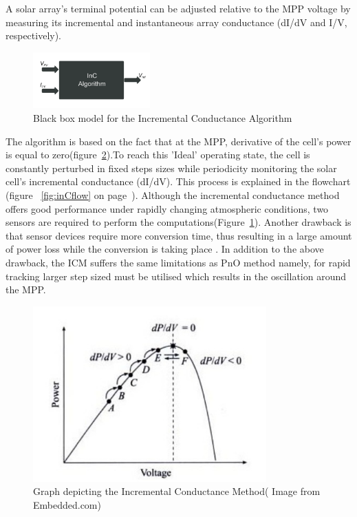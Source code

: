{  A solar array's terminal  potential  can  be  adjusted relative to the \ac{MPP} voltage by measuring its incremental and instantaneous  array  conductance (dI/dV and I/V, respectively).\\
   \begin{figure}[H]
             \begin{center}
             \includegraphics[width=0.4\textwidth]{images/inC_block}
             \caption{ Black box model for the Incremental Conductance Algorithm }
             \label{fig:inC_block}
        \end{center}
    \end{figure}
   The algorithm is based on the fact that at the \ac{MPP}, derivative of the cell's power is equal to zero(figure~\ref{fig:Inc_graph}).To reach this 'Ideal' operating state, the cell is constantly perturbed in fixed steps sizes while periodicity monitoring the solar cell's incremental conductance (dI/dV). This process is explained in the flowchart (figure ~\ref{fig:inCflow} on page~\pageref{fig:inCflow}).  Although the incremental conductance method offers good performance under rapidly changing atmospheric conditions, two sensors are required to perform the computations(Figure~\ref{fig:inC_block}). Another drawback is that sensor devices require more conversion time, thus resulting in a large amount of power loss while the conversion is taking place \cite{gomathy2012design}. In addition to the above drawback, the \ac{ICM} suffers the same limitations as \ac{PnO} method namely, for rapid tracking larger step sized must be utilised which results in the oscillation around the \ac{MPP}. 
   \begin{figure}[H]
         \begin{center}
         \includegraphics[width=0.8\textwidth]{images/Inc_graph}
         \caption{Graph depicting the Incremental Conductance Method( Image from Embedded.com)}
         \label{fig:Inc_graph}
         \end{center}
   \end{figure}
      
}
